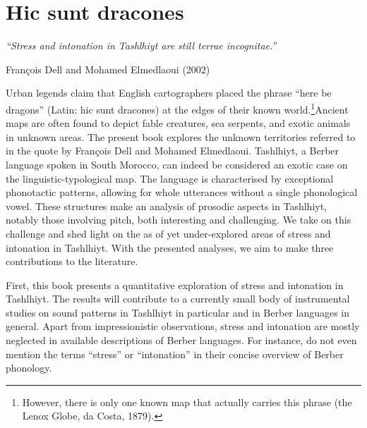 \chapter{Hic sunt dracones}

\begin{flushright}
\textit{“Stress and intonation in Tashlhiyt are still terrae incognitae.”} 

François Dell and Mohamed Elmedlaoui (2002)
\end{flushright}
\vspace{5mm}

Urban legends claim that English cartographers placed the phrase “here be dragons” (Latin: hic sunt dracones) at the edges of their known world.\footnote{However, there is only one known map that actually carries this phrase (the Lenox Globe, da Costa, 1879).}Ancient maps are often found to depict fable creatures, sea serpents, and exotic animals in unknown areas. The present book explores the unknown territories referred to in the quote by François Dell and Mohamed Elmedlaoui. Tashlhiyt, a Berber language spoken in South Morocco, can indeed be considered an exotic case on the linguistic-typological map. The language is characterised by exceptional phonotactic patterns, allowing for whole utterances without a single phonological vowel. These structures make an analysis of prosodic aspects in Tashlhiyt, notably those involving pitch, both interesting and challenging. We take on this challenge and shed light on the as of yet under-explored areas of stress and intonation in Tashlhiyt. With the presented analyses, we aim to make three contributions to the literature.

First, this book presents a quantitative exploration of stress and intonation in Tashlhiyt. The results will contribute to a currently small body of instrumental studies on sound patterns in Tashlhiyt in particular and in Berber languages in general. Apart from impressionistic observations, stress and intonation are mostly neglected in available descriptions of Berber languages. For instance, \citet{KossmannStroomer1997} do not even mention the terms “stress” or “intonation” in their concise overview of Berber phonology. 

